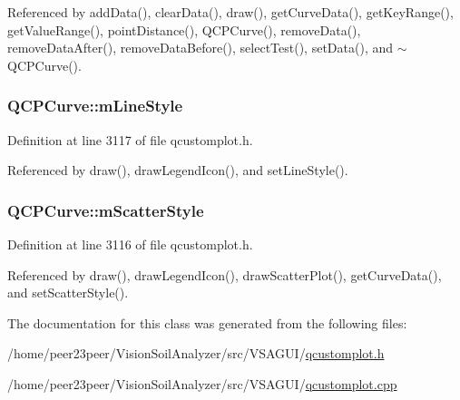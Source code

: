 Referenced by add\+Data(), clear\+Data(), draw(), get\+Curve\+Data(), get\+Key\+Range(), get\+Value\+Range(), point\+Distance(), Q\+C\+P\+Curve(), remove\+Data(), remove\+Data\+After(), remove\+Data\+Before(), select\+Test(), set\+Data(), and $\sim$\+Q\+C\+P\+Curve().

\hypertarget{class_q_c_p_curve_ae1f35ae2b15aee8e15bcdfec5be95156}{}
\subsubsection[{m\+Line\+Style}]{ Q\+C\+P\+Curve\+::m\+Line\+Style\hspace{0.3cm}{\ttfamily [protected]}}\label{class_q_c_p_curve_ae1f35ae2b15aee8e15bcdfec5be95156}


Definition at line 3117 of file qcustomplot.\+h.



Referenced by draw(), draw\+Legend\+Icon(), and set\+Line\+Style().

\hypertarget{class_q_c_p_curve_a08f803b4a30b01bbd7a1eab15d0f864f}{}
\subsubsection[{m\+Scatter\+Style}]{ Q\+C\+P\+Curve\+::m\+Scatter\+Style\hspace{0.3cm}{\ttfamily [protected]}}\label{class_q_c_p_curve_a08f803b4a30b01bbd7a1eab15d0f864f}


Definition at line 3116 of file qcustomplot.\+h.



Referenced by draw(), draw\+Legend\+Icon(), draw\+Scatter\+Plot(), get\+Curve\+Data(), and set\+Scatter\+Style().



The documentation for this class was generated from the following files\+:\begin{DoxyCompactItemize}
\item 
/home/peer23peer/\+Vision\+Soil\+Analyzer/src/\+V\+S\+A\+G\+U\+I/\hyperlink{qcustomplot_8h}{qcustomplot.\+h}\item 
/home/peer23peer/\+Vision\+Soil\+Analyzer/src/\+V\+S\+A\+G\+U\+I/\hyperlink{qcustomplot_8cpp}{qcustomplot.\+cpp}\end{DoxyCompactItemize}
